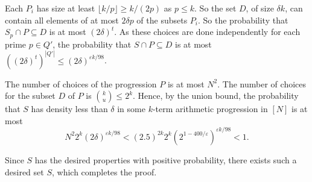 \documentclass[10pt,a4paper]{amsart}
\makeatletter
\renewenvironment{proof}[1][\proofname]{\par
  \vspace{-\topsep}%
  \pushQED{\qed}%
  \normalfont
  \topsep0pt \partopsep0pt %
  \trivlist
  \item[\hskip\labelsep
        \itshape
    #1\@addpunct{.}]\ignorespaces
}{%
  \popQED\endtrivlist\@endpefalse
  \addvspace{6pt plus 6pt} %
}
\makeatother
\begin{document}
\begin{proof}
Each $P_i$ has size at least $\lfloor k/p \rfloor \geq k/(2p)$ as $p \leq k$. So the set $D$, of size $\delta k$, can contain all elements of at most $2\delta p$ of the subsets $P_i$. So the probability that $S_p \cap P \subseteq D$ is at most $(2\delta)^t$. As these choices are done independently for each prime $p \in Q'$, the probability that $S \cap P \subseteq D$ is at most $((2\delta)^t)^{|Q'|} \leq (2\delta)^{\varepsilon k/98}$. 

The number of choices of the progression $P$ is at most $N^2$. The number of choices for the subset $D$ of $P$ is ${k \choose u} \leq 2^k$. Hence, by the union bound, the probability that $S$ has density less than $\delta$ in some $k$-term arithmetic progression in $[N]$ is at most $$N^2 2^k (2\delta)^{\varepsilon k/98}<(2.5)^{2k}2^k(2^{1-400/\varepsilon})^{\varepsilon k/98}<1.$$

Since $S$ has the desired properties with positive probability, there exists such a desired set $S$, which completes the proof. 
\end{proof}
\end{document}
